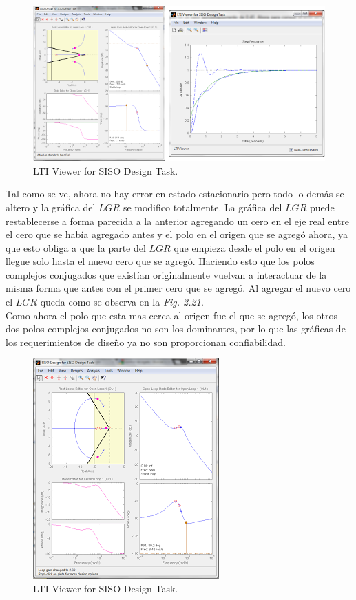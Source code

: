 \documentclass[a4paper,12pt,twoside]{proyectotanquesecci}
\begin{document}
\begin{figure}[h]
\centering
\includegraphics[scale=0.7]{Ventana14}
\renewcommand{\figurename}{Fig.}
\caption{LTI Viewer for SISO Design Task.}
\label{LTI Viewer for SISO Design Task.}
\end{figure}

Tal como se ve, ahora no hay error en estado estacionario pero todo lo demás se altero y la gráfica del $LGR$ se modifico totalmente. La gráfica del $LGR$ puede restablecerse a forma parecida a la anterior agregando un cero en el eje real entre el cero que se había agregado antes y el polo en el origen que se agregó ahora, ya que esto obliga a que la parte del $LGR$ que empieza desde el polo en el origen llegue solo hasta el nuevo cero que se agregó. Haciendo esto que los polos complejos conjugados que existían originalmente vuelvan a interactuar de la misma forma que antes con el primer cero que se agregó. Al agregar el nuevo cero el $LGR$ queda como se observa en la \textit{Fig. 2.21}. \\

Como ahora el polo que esta mas cerca al origen fue el que se agregó, los otros dos polos complejos conjugados no son los dominantes, por lo que las gráficas de los requerimientos de diseño ya no son proporcionan confiabilidad. \\

\begin{figure}[h]
\centering
\includegraphics[scale=0.7]{Ventana15}
\renewcommand{\figurename}{Fig.}
\caption{LTI Viewer for SISO Design Task.}
\label{LTI Viewer for SISO Design Task.}
\end{figure}
\end{document}
